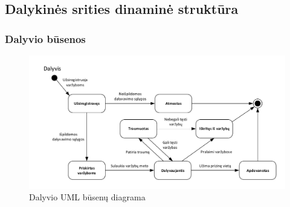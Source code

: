 \documentclass{VUMIFPSkursinis}
\begin{document}
  \subsection{Dalykinės srities dinaminė struktūra} \label{vidineVersloProcesoAnalize_dinamineStruktura}
    \subsubsection*{Dalyvio būsenos}
      \begin{figure}[H]
        \centering
        \includegraphics[width=\textwidth]{img/BusenuDiagrama1}
        \caption{Dalyvio UML būsenų diagrama}
        \label{fig:dalyvioBusenuDiagrama}
      \end{figure}
      
\end{document}
